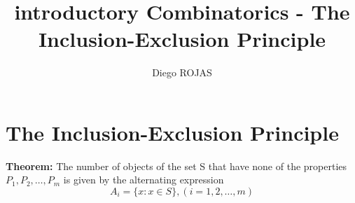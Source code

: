\documentclass[12pt]{article}
\title{introductory Combinatorics - The Inclusion-Exclusion Principle}
\author{Diego ROJAS}
\begin{document}
\maketitle
\tableofcontents

\section{The Inclusion-Exclusion Principle}

\textbf{Theorem:} The number of objects of the set S that have none of the properties $P_1, P_2, \dots, P_m$ is given by the alternating expression
%
\begin{equation}
	A_i = \{x : x \in S \}, (i = 1,2,\dots,m)
\end{equation}
\end{document}
